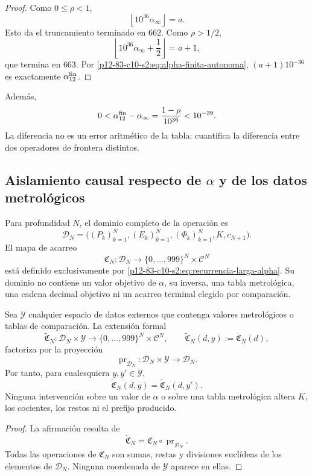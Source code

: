 \begin{proof}
Como \(0\leq\rho<1\),
\[
 \left\lfloor10^{36}\alpha_\infty\right\rfloor=a.
\]
Esto da el truncamiento terminado en \(662\). Como \(\rho>1/2\),
\[
 \left\lfloor10^{36}\alpha_\infty+\frac12\right\rfloor=a+1,
\]
que termina en \(663\). Por \eqref{p12-83-c10-s2:eq:alpha-finita-autonoma},
\((a+1)10^{-36}\) es exactamente \(\alpha_{12}^{\rm fin}\).
\end{proof}

Además,
\[
 0<\alpha_{12}^{\rm fin}-\alpha_\infty
 =\frac{1-\rho}{10^{36}}<10^{-39}.
\]
La diferencia no es un error aritmético de la tabla: cuantifica la
diferencia entre dos operadores de frontera distintos.

\subsection{Aislamiento causal respecto de \texorpdfstring{\(\alpha\)}{alpha} y de los datos metrológicos}

Para profundidad \(N\), el dominio completo de la operación es
\[
 \mathscr D_N
 =\bigl((P_k)_{k=1}^{N},(E_k)_{k=1}^{N},
        (\Phi_k)_{k=1}^{N},K,c_{N+1}\bigr).
\]
El mapa de acarreo
\[
 \mathfrak C_N:\mathscr D_N
 \longrightarrow
 \{0,\ldots,999\}^{N}\times\mathcal C^{N}
\]
está definido exclusivamente por \eqref{p12-83-c10-s2:eq:recurrencia-larga-alpha}. Su
dominio no contiene un valor objetivo de \(\alpha\), su inversa, una tabla
metrológica, una cadena decimal objetivo ni un acarreo terminal elegido por
comparación.

\begin{theorem}
\label{p12-83-c10-s2:thm:no-interferencia-metrologica-alpha}
Sea \(\mathscr Y\) cualquier espacio de datos externos que contenga valores
metrológicos o tablas de comparación. La extensión formal
\[
 \widetilde{\mathfrak C}_N:
 \mathscr D_N\times\mathscr Y
 \longrightarrow
 \{0,\ldots,999\}^{N}\times\mathcal C^{N},
 \qquad
 \widetilde{\mathfrak C}_N(d,y):=\mathfrak C_N(d),
\]
factoriza por la proyección
\[
 \operatorname{pr}_{\mathscr D_N}:
 \mathscr D_N\times\mathscr Y\longrightarrow\mathscr D_N.
\]
Por tanto, para cualesquiera \(y,y'\in\mathscr Y\),
\[
 \widetilde{\mathfrak C}_N(d,y)
 =\widetilde{\mathfrak C}_N(d,y').
\]
Ninguna intervención sobre un valor de \(\alpha\) o sobre una tabla
metrológica altera \(K\), los cocientes, los restos ni el prefijo producido.
\end{theorem}

\begin{proof}
La afirmación resulta de
\[
 \widetilde{\mathfrak C}_N
 =\mathfrak C_N\circ\operatorname{pr}_{\mathscr D_N}.
\]
Todas las operaciones de \(\mathfrak C_N\) son sumas, restas y divisiones
euclídeas de los elementos de \(\mathscr D_N\). Ninguna coordenada de
\(\mathscr Y\) aparece en ellas.
\end{proof}

